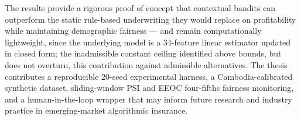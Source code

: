 The results provide a rigorous proof of concept that contextual bandits can outperform the static rule-based underwriting they would replace on profitability while maintaining demographic fairness --- and remain computationally lightweight, since the underlying model is a 34-feature linear estimator updated in closed form; the inadmissible constant ceiling identified above bounds, but does not overturn, this contribution against admissible alternatives. The thesis contributes a reproducible 20-seed experimental harness, a Cambodia-calibrated synthetic dataset, sliding-window PSI and EEOC four-fifths fairness monitoring, and a human-in-the-loop wrapper that may inform future research and industry practice in emerging-market algorithmic insurance.
